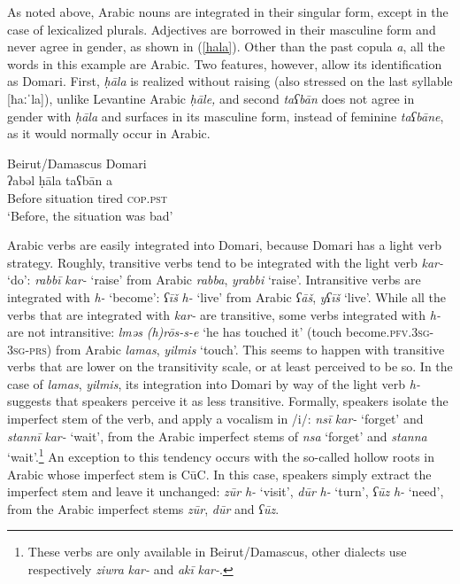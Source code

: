 \documentclass[output=paper]{langsci/langscibook}
\begin{document}
As noted above, Arabic nouns are integrated in their singular form, except in the case of lexicalized plurals. Adjectives are borrowed in their masculine form and never agree in gender, as shown in (\ref{hala}). Other than the past copula \textit{a}, all the words in this example are Arabic. Two features, however, allow its identification as Domari. First, \textit{ḥāla} is realized without raising (also stressed on the last syllable [ħaːˈla]), unlike Levantine Arabic \textit{ḥāle,} and second \textit{taʕbān} does not agree in gender with \textit{ḥāla} and surfaces in its masculine form, instead of feminine \textit{taʕbāne}, as it would normally occur in Arabic.

\ea \label{hala}
{Beirut/Damascus Domari}\\
\gll ʔabəl ḥāla taʕbān a\\
     Before situation tired \textsc{cop.pst}\\
\glt ‘Before, the situation was bad’
\z

Arabic verbs are easily integrated into Domari, because Domari has a light verb strategy. Roughly, transitive verbs tend to be integrated with the light verb \textit{kar-} ‘do’: \textit{rabbī} \textit{kar-} ‘raise’ from Arabic \textit{rabba}, \textit{yrabbi} ‘raise’. Intransitive verbs are integrated with \textit{h-} ‘become’: \textit{ʕīš} \textit{h-} ‘live’ from Arabic \textit{ʕāš}, \textit{yʕīš} ‘live’. While all the verbs that are integrated with \textit{kar-} are transitive, some verbs integrated with \textit{h-} are not intransitive: \textit{lməs} \textit{(h)rōs-s-e} ‘he has touched it’ (touch become.\textsc{pfv.3sg-3sg-prs}) from Arabic \textit{lamas}, \textit{yilmis} ‘touch’. This seems to happen with transitive verbs that are lower on the transitivity scale, or at least perceived to be so. In the case of \textit{lamas}, \textit{yilmis}, its integration into Domari by way of the light verb \textit{h-} suggests that speakers perceive it as less transitive. Formally, speakers isolate the imperfect stem of the verb, and apply a vocalism in /i/: \textit{nsī} \textit{kar-} ‘forget’ and \textit{stannī} \textit{kar-} ‘wait’, from the Arabic imperfect stems of \textit{nsa} ‘forget’ and \textit{stanna} ‘wait’.\footnote{These verbs are only available in Beirut/Damascus, other dialects use respectively \textit{ziwra} \textit{kar-} and \textit{akī} \textit{kar-}.} An exception to this tendency occurs with the so-called hollow roots in Arabic whose imperfect stem is CūC. In this case, speakers simply extract the imperfect stem and leave it unchanged: \textit{zūr} \textit{h-} ‘visit’, \textit{dūr} \textit{h-} ‘turn’, \textit{ʕūz} \textit{h-} ‘need’, from the Arabic imperfect stems \textit{zūr}, \textit{dūr} and \textit{ʕūz}.
\end{document}

